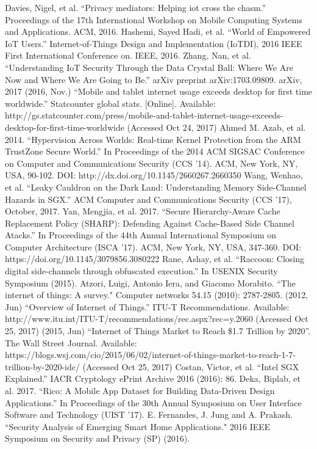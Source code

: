  Davies, Nigel, et al. ``Privacy mediators: Helping iot cross the chasm.'' Proceedings of the 17th International Workshop on Mobile Computing Systems and Applications. ACM, 2016.
 Hashemi, Sayed Hadi, et al. ``World of Empowered IoT Users.'' Internet-of-Things Design and Implementation (IoTDI), 2016 IEEE First International Conference on. IEEE, 2016.
 Zhang, Nan, et al. ``Understanding IoT Security Through the Data Crystal Ball: Where We Are Now and Where We Are Going to Be.'' arXiv preprint arXiv:1703.09809. arXiv, 2017
 (2016, Nov.) ``Mobile and tablet internet usage exceeds desktop for first time worldwide.'' Statcounter global stats. [Online]. Available: http://gs.statcounter.com/press/mobile-and-tablet-internet-usage-exceeds-desktop-for-first-time-worldwide (Accessed Oct 24, 2017)
 Ahmed M. Azab, et al. 2014. ``Hypervision Across Worlds: Real-time Kernel Protection from the ARM TrustZone Secure World.'' In Proceedings of the 2014 ACM SIGSAC Conference on Computer and Communications Security (CCS '14). ACM, New York, NY, USA, 90-102. DOI: http://dx.doi.org/10.1145/2660267.2660350
 Wang, Wenhao, et al. ``Leaky Cauldron on the Dark Land: Understanding Memory Side-Channel Hazards in SGX.'' ACM Computer and Communications Security (CCS ’17), October, 2017.
 Yan, Mengjia, et al. 2017. ``Secure Hierarchy-Aware Cache Replacement Policy (SHARP): Defending Against Cache-Based Side Channel Atacks.'' In Proceedings of the 44th Annual International Symposium on Computer Architecture (ISCA '17). ACM, New York, NY, USA, 347-360. DOI: https://doi.org/10.1145/3079856.3080222
 Rane, Ashay, et al. ``Raccoon: Closing digital side-channels through obfuscated execution.'' In USENIX Security Symposium (2015).
 Atzori, Luigi, Antonio Iera, and Giacomo Morabito. ``The internet of things: A survey." Computer networks 54.15 (2010): 2787-2805.
 (2012, Jun) ``Overview of Internet of Things.'' ITU-T Recommendations. Available: http://www.itu.int/ITU-T/recommendations/rec.aspx?rec=y.2060 (Accessed Oct 25, 2017)
 (2015, Jun) ``Internet of Things Market to Reach \$1.7 Trillion by 2020''. The Wall Street Journal. Available: https://blogs.wsj.com/cio/2015/06/02/internet-of-things-market-to-reach-1-7-trillion-by-2020-idc/ (Accessed Oct 25, 2017)
 Costan, Victor, et al. ``Intel SGX Explained.'' IACR Cryptology ePrint Archive 2016 (2016): 86.
 Deka, Biplab, et al. 2017. ``Rico: A Mobile App Dataset for Building Data-Driven Design Applications.'' In Proceedings of the 30th Annual Symposium on User Interface Software and Technology (UIST '17).
 E. Fernandes, J. Jung and A. Prakash. ``Security Analysis of Emerging Smart Home Applications." 2016 IEEE Symposium on Security and Privacy (SP) (2016).
